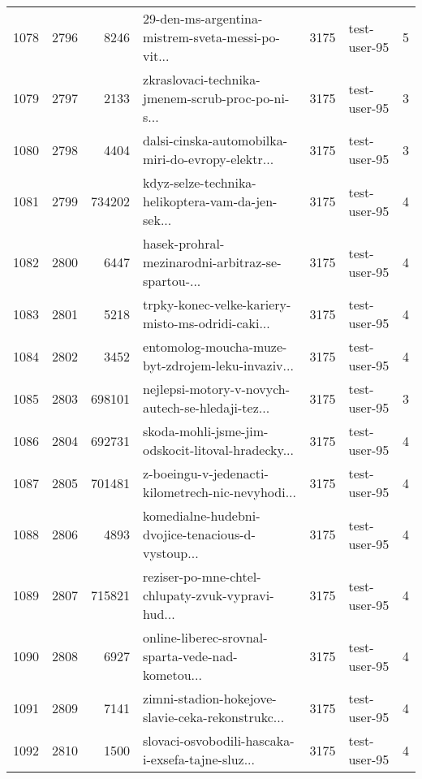 \begin{tabular}{lrrlrlr}
1078 &       2796 &     8246 &  29-den-ms-argentina-mistrem-sveta-messi-po-vit... &     3175 &                 test-user-95 &               5 \\
1079 &       2797 &     2133 &  zkraslovaci-technika-jmenem-scrub-proc-po-ni-s... &     3175 &                 test-user-95 &               3 \\
1080 &       2798 &     4404 &  dalsi-cinska-automobilka-miri-do-evropy-elektr... &     3175 &                 test-user-95 &               3 \\
1081 &       2799 &   734202 &  kdyz-selze-technika-helikoptera-vam-da-jen-sek... &     3175 &                 test-user-95 &               4 \\
1082 &       2800 &     6447 &  hasek-prohral-mezinarodni-arbitraz-se-spartou-... &     3175 &                 test-user-95 &               4 \\
1083 &       2801 &     5218 &  trpky-konec-velke-kariery-misto-ms-odridi-caki... &     3175 &                 test-user-95 &               4 \\
1084 &       2802 &     3452 &  entomolog-moucha-muze-byt-zdrojem-leku-invaziv... &     3175 &                 test-user-95 &               4 \\
1085 &       2803 &   698101 &  nejlepsi-motory-v-novych-autech-se-hledaji-tez... &     3175 &                 test-user-95 &               3 \\
1086 &       2804 &   692731 &  skoda-mohli-jsme-jim-odskocit-litoval-hradecky... &     3175 &                 test-user-95 &               4 \\
1087 &       2805 &   701481 &  z-boeingu-v-jedenacti-kilometrech-nic-nevyhodi... &     3175 &                 test-user-95 &               4 \\
1088 &       2806 &     4893 &  komedialne-hudebni-dvojice-tenacious-d-vystoup... &     3175 &                 test-user-95 &               4 \\
1089 &       2807 &   715821 &  reziser-po-mne-chtel-chlupaty-zvuk-vypravi-hud... &     3175 &                 test-user-95 &               4 \\
1090 &       2808 &     6927 &  online-liberec-srovnal-sparta-vede-nad-kometou... &     3175 &                 test-user-95 &               4 \\
1091 &       2809 &     7141 &  zimni-stadion-hokejove-slavie-ceka-rekonstrukc... &     3175 &                 test-user-95 &               4 \\
1092 &       2810 &     1500 &  slovaci-osvobodili-hascaka-i-exsefa-tajne-sluz... &     3175 &                 test-user-95 &               4 \\

\end{tabular}
